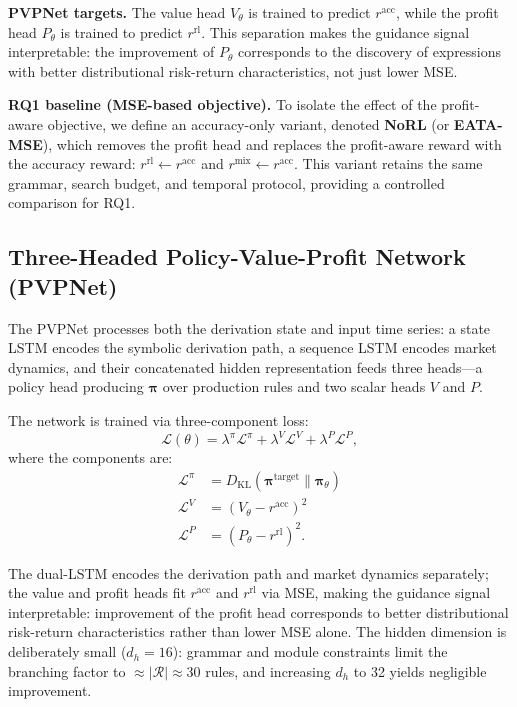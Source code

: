 \documentclass{elektr}
\theoremstyle{corollary}
\theoremstyle{lemma}
\theoremstyle{proposition}
\theoremstyle{axiom}
\theoremstyle{conjecture}
\theoremstyle{example}
\theoremstyle{definition}
\theoremstyle{remark}
\begin{document}
\textbf{PVPNet targets.} The value head $V_{\theta}$ is trained to predict $r^{\text{acc}}$, while the profit head $P_{\theta}$ is trained to predict $r^{\text{rl}}$. This separation makes the guidance signal interpretable: the improvement of $P_{\theta}$ corresponds to the discovery of expressions with better distributional risk-return characteristics, not just lower MSE.

\textbf{RQ1 baseline (MSE-based objective).} To isolate the effect of the profit-aware objective, we define an accuracy-only variant, denoted \textbf{NoRL} (or \textbf{EATA-MSE}), which removes the profit head and replaces the profit-aware reward with the accuracy reward: $r^{\text{rl}} \leftarrow r^{\text{acc}}$ and $r^{\text{mix}} \leftarrow r^{\text{acc}}$. This variant retains the same grammar, search budget, and temporal protocol, providing a controlled comparison for RQ1.

\subsection{Three-Headed Policy-Value-Profit Network (PVPNet)}
\label{subsec:pvnet}

The PVPNet processes both the derivation state and input time series: a state LSTM encodes the symbolic derivation path, a sequence LSTM encodes market dynamics, and their concatenated hidden representation feeds three heads---a policy head producing $\boldsymbol{\pi}$ over production rules and two scalar heads $V$ and $P$.

The network is trained via three-component loss:
\begin{equation}
\mathcal{L}(\theta) = \lambda^{\pi} \mathcal{L}^{\pi} + \lambda^{V} \mathcal{L}^{V} + \lambda^{P} \mathcal{L}^{P},
\label{eq:loss}
\end{equation}
where the components are:
\begin{align}
\mathcal{L}^{\pi} &= D_{\text{KL}}(\boldsymbol{\pi}^{\text{target}} \| \boldsymbol{\pi}_{\theta}) \label{eq:loss_policy}\\
\mathcal{L}^{V} &= \left(V_{\theta} - r^{\text{acc}}\right)^{2} \label{eq:loss_value}\\
\mathcal{L}^{P} &= \left(P_{\theta} - r^{\text{rl}}\right)^{2}. \label{eq:loss_profit}
\end{align}

The dual-LSTM encodes the derivation path and market dynamics separately; the value and profit heads fit $r^{\text{acc}}$ and $r^{\text{rl}}$ via MSE, making the guidance signal interpretable: improvement of the profit head corresponds to better distributional risk-return characteristics rather than lower MSE alone. The hidden dimension is deliberately small ($d_h=16$): grammar and module constraints limit the branching factor to $\approx |\mathcal{R}| \approx 30$ rules, and increasing $d_h$ to 32 yields negligible improvement.
\end{document}
